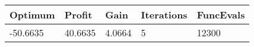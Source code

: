\begin{tabular}{lllll}
Optimum & Profit & Gain & Iterations & FuncEvals \\ 
\hline 
-50.6635 & 40.6635 & 4.0664 & 5 & 12300 \\ 
\hline 
\end{tabular}